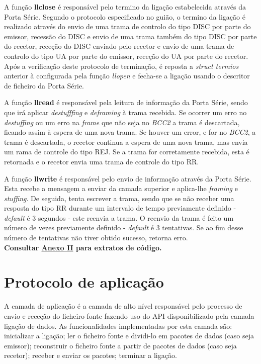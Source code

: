 \documentclass[a4paper, 11pt]{article}
\begin{document}
A função \textbf{llclose} é responsável pelo termino da ligação estabelecida através da Porta Série. Segundo o protocolo especificado no guião, o termino da ligação é realizado através do envio de uma trama de controlo do tipo DISC por parte do emissor,  recessão do DISC e envio de uma trama também do tipo DISC por parte do recetor, receção do DISC enviado pelo recetor e envio de uma trama de controlo do tipo UA por parte do emissor, receção do UA por parte do recetor. Após a verificação deste protocolo de terminação, é reposta a \textit{struct termios} anterior à configurada pela função \textit{llopen} e fecha-se a ligação usando o descritor de ficheiro da Porta Série.

A função \textbf{llread} é responsável pela leitura de informação da Porta Série, sendo que irá aplicar \textit{destufffing} e \textit{deframing} à trama recebida. Se ocorrer um erro no \textit{destuffing} ou um erro na \textit{frame} que não seja no \textit{BCC2} a trama é descartada, ficando assim à espera de uma nova trama. Se houver um error, e for no \textit{BCC2}, a trama é descartada, o recetor continua a espera de uma nova trama, mas envia um rama de controle do tipo REJ. Se a trama for corretamente recebida, esta é retornada e o recetor envia uma trama de controle do tipo RR.

A função \textbf{llwrite} é responsável pelo envio de informação através da Porta Série. Esta recebe a mensagem a enviar da camada superior e aplica-lhe \textit{framing} e \textit{stuffing}.
De seguida, tenta escrever a trama, sendo que se não receber uma resposta do tipo RR durante um intervalo de tempo previamente definido - \textit{default} é 3 segundos - este reenvia a trama. O reenvio da trama é feito um número de vezes previamente definido - \textit{default} é 3 tentativas. Se ao fim desse número de tentativas não tiver obtido sucesso, retorna erro.\\

\textbf{Consultar \underline{Anexo II} para extratos de código.}

\section{Protocolo de aplicação}

A camada de aplicação é a camada de alto nível responsável pelo processo de envio e receção do ficheiro fonte fazendo uso do API disponibilizado pela camada ligação de dados. As funcionalidades implementadas por esta camada são: inicializar a ligação; ler o ficheiro fonte e dividi-lo em pacotes de dados (caso seja emissor); reconstruir o ficheiro fonte a partir de pacotes de dados (caso seja recetor); receber e enviar os pacotes; terminar a ligação.\\
\end{document}
